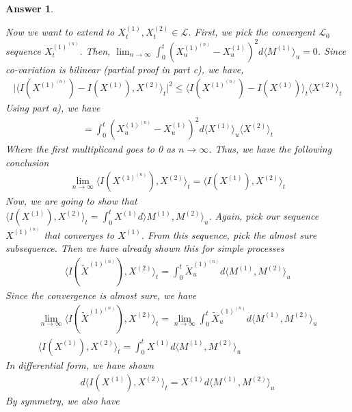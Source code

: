 \documentclass[12pt]{article}
\theoremstyle{colon}
\newtheorem*{answer}{Answer}
\begin{document}
\begin{answer}
\begin{enumerate}[label=\alph*)]
      Now we want to extend to $X_t^{(1)}, X_t^{(2)} \in \mathcal{L}$. First, we pick the convergent $\mathcal{L}_0$ sequence $X_t^{(1)^{(n)}}$. Then, $\lim_{n \rightarrow \infty} \int_0^t (X_u^{(1)^{(n)}} - X_u^{(1)})^2 d \langle M^{(1)} \rangle_u = 0$. Since co-variation is bilinear (partial proof in part c), we have,
      \begin{gather*}
        \lvert \langle I(X^{(1)^{(n)}}) - I(X^{(1)}), X^{(2)} \rangle_t \rvert^2 \leq \langle I(X^{(1)^{(n)}}) - I(X^{(1)}) \rangle_t \langle X^{(2)} \rangle_t
      \end{gather*}
      Using part a), we have
      \begin{gather*}
        = \int_0^t (X_u^{(1)^{(n)}} - X_u^{(1)})^2 d \langle X^{(1)} \rangle_u \langle X^{(2)} \rangle_t
      \end{gather*}
      Where the first multiplicand goes to 0 as $n \rightarrow \infty$. Thus, we have the following conclusion
      \begin{gather*}
        \lim_{n \rightarrow \infty} \langle I(X^{(1)^{(n)}}), X^{(2)} \rangle_t = \langle I(X^{(1)}), X^{(2)} \rangle_t
      \end{gather*}
      Now, we are going to show that \\ $\langle I(X^{(1)}), X^{(2)} \rangle_t = \int_0^t X^{(1)} d \rangle M^{(1)}, M^{(2)} \rangle_u$. Again, pick our sequence $X^{(1)^{(n)}}$ that converges to $X^{(1)}$. From this sequence, pick the almost sure subsequence. Then we have already shown this for simple processes
      \begin{gather*}
        \langle I(\tilde{X}^{(1)^{(n)}}), X^{(2)} \rangle_t = \int_0^t \tilde{X}_u^{(1)^{(n)}} d \langle M^{(1)}, M^{(2)} \rangle_u
      \end{gather*}
      Since the convergence is almost sure, we have
      \begin{gather*}
        \lim_{n \rightarrow \infty} \langle I(\tilde{X}^{(1)^{(n)}}), X^{(2)} \rangle_t = \lim_{n \rightarrow \infty} \int_0^t \tilde{X}_u^{(1)^{(n)}} d \langle M^{(1)}, M^{(2)} \rangle_u \\
        \langle I(X^{(1)}), X^{(2)} \rangle_t = \int_0^t X^{(1)} d \langle M^{(1)}, M^{(2)} \rangle_u
      \end{gather*}
      In differential form, we have shown
      \begin{gather*}
        d \langle I(X^{(1)}), X^{(2)} \rangle_t = X^{(1)} d \langle M^{(1)}, M^{(2)} \rangle_u
      \end{gather*}
      By symmetry, we also have

\end{enumerate}
\end{answer}
\end{document}
